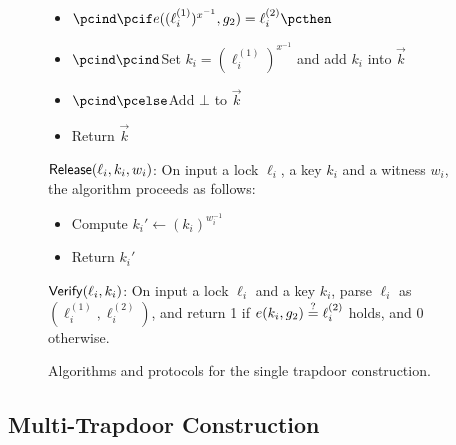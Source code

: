 \begin{figure*}[htb]
\begin{center}
{\begin{minipage}[t]{0.75\textwidth}
\begin{itemize}[label=-]
				\item $\pcind \pcif e((\ell_i^{(1)})^{x^{-1}}, g_2) = \ell_i^{(2)} \pcthen$
				\item $\pcind \pcind$Set $k_i = (\ell_i^{(1)})^{x^{-1}}$ and add $k_i$ into $
				\vec{k}$
				\item $\pcind \pcelse$Add $\bot$ to $\vec{k}$\
				\item Return $\vec{k}$
			\end{itemize}
			\underline{$\mathsf{Release}(\ell_i, k_i, w_i)$}: On input a lock $\ell_i$, a key $k_i$ and 
			a witness $w_i$, the algorithm proceeds as follows:
			\begin{itemize}
				\item Compute $k_i' \gets (k_i)^{w_i^{-1}}$
				\item Return $k_i'$
			\end{itemize}
			\underline{$\mathsf{Verify}(\ell_i, k_i)$}: On input a lock $\ell_i$ and a key $k_i$, 
			parse $\ell_i$ as $(\ell_i^{(1)}, \ell_i^{(2)})$, and return 1 if $e(k_i, g_2) \stackrel{?}{=} 
			\ell_i^{(2)}$ holds, and 0 otherwise.
		\end{minipage}
	}
	\end{center}
	
	\caption{Algorithms and protocols for the single trapdoor construction.}
	\label{fig:single-trapdoor}
\end{figure*}


\subsection{Multi-Trapdoor Construction}


